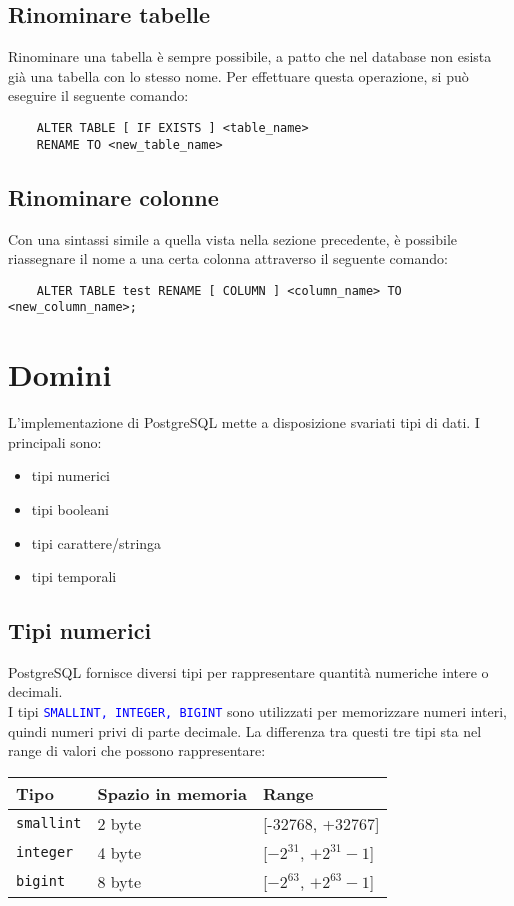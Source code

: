 \documentclass[12pt,a4paper]{book}
\begin{document}
	\subsection{Rinominare tabelle}
	Rinominare una tabella è sempre possibile, a patto che nel database non esista già una tabella con lo stesso nome. Per effettuare questa operazione, si può eseguire il seguente comando:
	\begin{lstlisting}
	ALTER TABLE [ IF EXISTS ] <table_name>
	RENAME TO <new_table_name>
	\end{lstlisting}
	\subsection{Rinominare colonne}
	Con una sintassi simile a quella vista nella sezione precedente, è possibile riassegnare il nome a una certa colonna attraverso il seguente comando:
	\begin{lstlisting}
	ALTER TABLE test RENAME [ COLUMN ] <column_name> TO <new_column_name>;
	\end{lstlisting}
	\section{Domini}
	L'implementazione di PostgreSQL mette a disposizione svariati tipi di dati. I principali sono:
	\begin{itemize}
		\item tipi numerici
		\item tipi booleani
		\item tipi carattere/stringa
		\item tipi temporali
	\end{itemize}
	\subsection{Tipi numerici}
	PostgreSQL fornisce diversi tipi per rappresentare quantità numeriche intere o decimali.\\
	I tipi \textcolor{blue}{\texttt{SMALLINT, INTEGER, BIGINT}} sono utilizzati per memorizzare numeri interi, quindi numeri privi di parte decimale. La differenza tra questi tre tipi sta nel range di valori che possono rappresentare:\vspace{10px}\\
	\renewcommand{\arraystretch}{1.5}
	\begin{tabular}{| l | l | l |}
		\hline
		Tipo & Spazio in memoria & Range\\
		\hline
		\texttt{smallint} & 2 byte & [-32768, +32767]\\
		\texttt{integer} & 4 byte & [$-2^{31}$, $+2^{31}-1$]\\
		\texttt{bigint} & 8 byte & [$-2^{63}$, $+2^{63}-1$]\\
		\hline
	\end{tabular}\vspace{10px}
\end{document}

